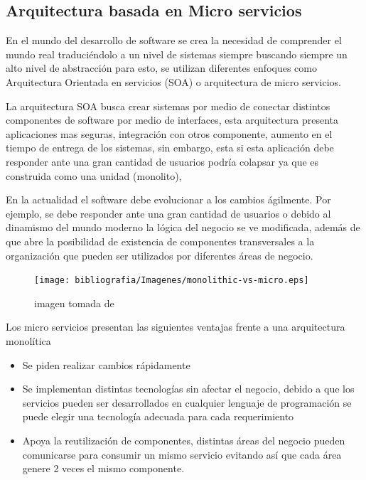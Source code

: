 \subsection{Arquitectura basada en Micro servicios}

En el mundo del desarrollo de software se crea la necesidad de comprender el mundo real traduciéndolo a un nivel de sistemas siempre buscando siempre un alto nivel de abstracción para esto, se utilizan diferentes enfoques como Arquitectura Orientada en servicios (SOA) o arquitectura de micro servicios. 

La arquitectura SOA busca crear sistemas por medio de conectar distintos componentes de software por medio de interfaces, esta arquitectura presenta aplicaciones mas seguras, integración con otros componente, aumento en el tiempo de entrega de los sistemas, sin embargo, esta si esta aplicación debe responder ante una gran cantidad de usuarios podría colapsar ya que es construida como una unidad (monolito),  

En la actualidad el software debe evolucionar a los cambios ágilmente. Por ejemplo, se debe responder ante una gran cantidad de usuarios o debido al dinamismo del mundo moderno la lógica del negocio se ve modificada, además de que abre la posibilidad de existencia de componentes transversales a la organización que pueden ser utilizados por diferentes áreas de negocio.

\begin{figure}[H]
    \centering
    \texttt{[image: bibliografia/Imagenes/monolithic-vs-micro.eps]}
    \caption{imagen tomada de \cite{microservicios}}
\end{figure}


Los micro servicios presentan las siguientes ventajas frente a una arquitectura monolítica 

\begin{itemize}
    \item Se piden realizar cambios rápidamente
    \item Se implementan distintas tecnologías sin afectar el negocio, debido a que los servicios pueden ser desarrollados en  cualquier lenguaje de programación se puede elegir una tecnología adecuada para cada requerimiento
    \item Apoya la reutilización de componentes, distintas áreas del negocio pueden comunicarse para consumir un mismo servicio evitando así que cada área genere 2 veces el mismo componente.
\end{itemize}

